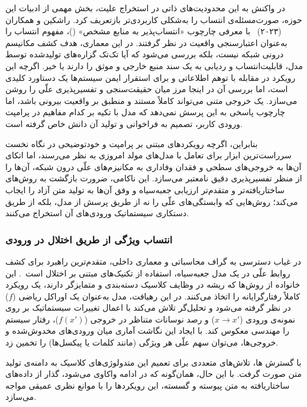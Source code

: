 در واکنش به این محدودیت‌های ذاتی در استخراج علیت، بخش مهمی از ادبیات این حوزه، صورت‌مسئله‌ی انتساب را به‌شکلی کاربردی‌تر بازتعریف کرد. راشکین و همکاران (۲۰۲۳)~\cite{rashkin2023measuring} با معرفی چارچوب «انتساب‌پذیر به منابع مشخص» ()، مفهوم انتساب را به‌عنوان اعتبارسنجی واقعیت در نظر گرفتند. در این معماری، هدف کشف مکانیسم درونی شبکه نیست، بلکه بررسی می‌شود که آیا تک‌تک گزاره‌های تولیدشده توسط مدل، قابلیت‌انتساب و ردیابی به یک سند منبع خارجی و موثق را دارند یا خیر. اگرچه این رویکرد در مقابله با توهم اطلاعاتی و برای استقرار ایمن سیستم‌ها یک دستاورد کلیدی است، اما بررسی آن در اینجا مرز میان حقیقت‌سنجی و تفسیرپذیری علّی را روشن می‌سازد. یک خروجی متنی می‌تواند کاملاً مستند و منطبق بر واقعیت بیرونی باشد، اما چارچوب  پاسخی به این پرسش نمی‌دهد که مدل با تکیه بر کدام مفاهیم در پرامپت ورودی کاربر، تصمیم به فراخوانی و تولید آن دانش خاص گرفته است.

بنابراین، اگرچه رویکردهای مبتنی بر پرامپت و خودتوضیحی در نگاه نخست سرراست‌ترین ابزار برای تعامل با مدل‌های مولد امروزی به نظر می‌رسند، اما اتکای آن‌ها به خروجی‌های سطحی و فقدان وفاداری به مکانیزم‌های علّی درون شبکه، آن‌ها را از منظر تفسیرپذیری دقیق نامعتبر می‌سازد. این ناکامی، ضرورت بازگشت به روش‌های ساختاریافته‌تر و متقدم‌تر ارزیابی جعبه‌سیاه و وفق آن‌ها به تولید متن آزاد را ایجاب می‌کند؛ روش‌هایی که وابستگی‌های علّی را نه از طریق پرسش از مدل، بلکه از طریق دستکاری سیستماتیک ورودی‌های آن استخراج می‌کنند.


\subsubsection{انتساب ویژگی از طریق اختلال در ورودی}\label{sec:3-1-3-2}

در غیاب دسترسی به گراف محاسباتی و معماری داخلی، متقدم‌ترین راهبرد برای کشف روابط علّی در یک مدل جعبه‌سیاه، استفاده از تکنیک‌های مبتنی بر اختلال است~\cite{guidotti2018survey}. این خانواده از روش‌ها که ریشه در وظایف کلاسیک دسته‌بندی و متمایزگر دارند، یک رویکرد کاملاً رفتارگرایانه را اتخاذ می‌کنند. در این رهیافت، مدل به‌عنوان یک اوراکل ریاضی ($f$) در نظر گرفته می‌شود و تحلیل‌گر تلاش می‌کند با اعمال تغییرات سیستماتیک بر روی نمونه‌ی ورودی ($x \rightarrow x'$) و رصد نوسانات متناظر در خروجی ($f(x')$)، رفتار سیستم را مهندسی معکوس کند. با ایجاد این نگاشت آماری میان ورودی‌های مخدوش‌شده و خروجی‌ها، می‌توان سهم علّی هر ویژگی (مانند کلمات یا پیکسل‌ها) را تخمین زد.

با گسترش ها، تلاش‌های متعددی برای تعمیم این متدولوژی‌های کلاسیک به دامنه‌ی تولید متن صورت گرفت. با این حال، همان‌گونه که در ادامه واکاوی می‌شود، گذار از داده‌های ساختاریافته به متن پیوسته و گسسته، این رویکردها را با موانع نظری عمیقی مواجه می‌سازد.

